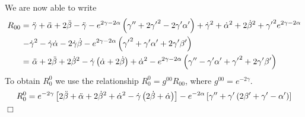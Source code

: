 We are now able to write
\begin{align*}
    R_{00} =& \text{ } \Ddot{\gamma} + \Ddot{\alpha} + 2\Ddot{\beta} - \Ddot{\gamma} - e^{2\gamma-2\alpha}\left(\gamma^{\prime \prime}+2{\gamma^\prime}^2 -2 \gamma^\prime \alpha^\prime \right) + \dot{\gamma}^2 + \dot{\alpha}^2 + 2 \dot{\beta}^2 + {\gamma^\prime}^2 e^{2\gamma-2\alpha}
    \\ -& \dot{\gamma}^2 - \dot{\gamma}\Dot{\alpha} - 2\dot{\gamma}\Dot{\beta} 
     - e^{2\gamma-2\alpha}\left({\gamma^\prime}^2+ \gamma^\prime \alpha^\prime + 2\gamma^\prime \beta^\prime \right)
    \\ =& \text{ } \Ddot{\alpha} + 2\Ddot{\beta} + 2 \dot{\beta}^2  -
    \Dot{\gamma} \left( \Dot{\alpha} + 2\Dot{\beta} \right) + \dot{\alpha}^2 - e^{2\gamma-2\alpha}\left( \gamma^{\prime \prime} - \gamma^\prime \alpha^\prime + {\gamma^\prime}^2 + 2\gamma^\prime \beta^\prime\right)
\end{align*}
To obtain $R^0_0$ we use the relationship $R^0_0=g^{0 0}R_{0 0}$, where $g^{0 0} = e^{-2\gamma}$. 
\begin{equation*}
    R^0_0=e^{-2\gamma}\left[ 2 \Ddot{\beta} + \Ddot{\alpha} + 2 \dot{\beta}^2 + \dot{\alpha}^2 - \dot{\gamma} \left( 2 \dot{\beta} + \dot{\alpha} \right) \right] - e^{-2 \alpha}\left[ \gamma^{\prime \prime} + \gamma^{\prime} \left( 2 \beta^\prime + \gamma^\prime - \alpha^\prime \right) \right]
\end{equation*}
\hspace*{\fill} $\Box$